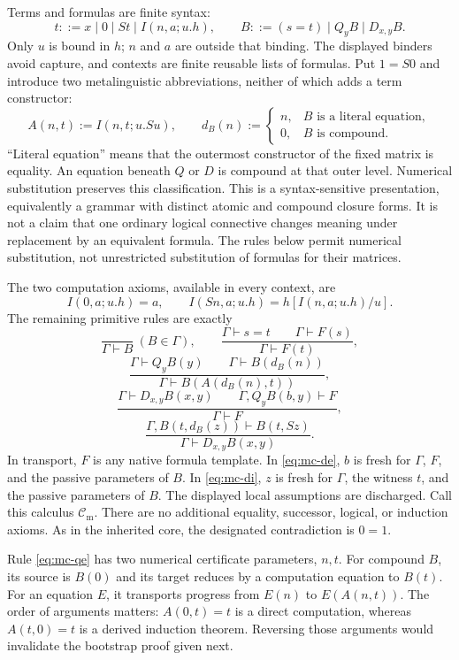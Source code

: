 \documentclass[11pt,letterpaper]{article}
\theoremstyle{definition}
\theoremstyle{remark}
\begin{document}
Terms and formulas are finite syntax:
\[
 t::=x\mid0\mid St\mid I(n,a;u.h),\qquad
 B::=(s=t)\mid Q_yB\mid D_{x,y}B.
\]
Only $u$ is bound in $h$; $n$ and $a$ are outside that binding.
The displayed binders avoid capture, and contexts are finite reusable
lists of formulas.  Put $1=S0$ and introduce two metalinguistic
abbreviations, neither of which adds a term constructor:
\[
 A(n,t):=I(n,t;u.Su),\qquad
 d_B(n):=
 \begin{cases}
 n,&B\text{ is a literal equation},\\
 0,&B\text{ is compound}.
 \end{cases}
 \tag{MC1}\label{eq:mc-data}
\]
``Literal equation'' means that the outermost constructor of the fixed
matrix is equality.  An equation beneath $Q$ or $D$ is compound at that
outer level.  Numerical substitution preserves this classification.
This is a syntax-sensitive presentation, equivalently a grammar with
distinct atomic and compound closure forms.  It is not a claim that
one ordinary logical connective changes meaning under replacement by
an equivalent formula.  The rules below permit numerical substitution,
not unrestricted substitution of formulas for their matrices.

The two computation axioms, available in every context, are
\[
 I(0,a;u.h)=a,\qquad
 I(Sn,a;u.h)=h[I(n,a;u.h)/u].
 \tag{MC2}\label{eq:mc-comp}
\]
The remaining primitive rules are exactly
\[
 \frac{}{\Gamma\vdash B}\ (B\in\Gamma),
 \qquad
 \frac{\Gamma\vdash s=t\qquad\Gamma\vdash F(s)}
      {\Gamma\vdash F(t)},
 \tag{MC3}\label{eq:mc-hyp-tr}
\]
\[
 \frac{\Gamma\vdash Q_yB(y)\qquad
       \Gamma\vdash B(d_B(n))}
      {\Gamma\vdash B(A(d_B(n),t))},
 \tag{MC4}\label{eq:mc-qe}
\]
\[
 \frac{\Gamma\vdash D_{x,y}B(x,y)\qquad
       \Gamma,Q_yB(b,y)\vdash F}
      {\Gamma\vdash F},
 \tag{MC5}\label{eq:mc-de}
\]
\[
 \frac{\Gamma,B(t,d_B(z))\vdash B(t,Sz)}
      {\Gamma\vdash D_{x,y}B(x,y)}.
 \tag{MC6}\label{eq:mc-di}
\]
In transport, $F$ is any native formula template.  In
\eqref{eq:mc-de}, $b$ is fresh for $\Gamma$, $F$, and the passive
parameters of $B$.  In \eqref{eq:mc-di}, $z$ is fresh for $\Gamma$,
the witness $t$, and the passive parameters of $B$.  The displayed local
assumptions are discharged.  Call this calculus $\mathcal C_{\mathrm m}$.
There are no additional equality, successor, logical, or induction axioms.
As in the inherited core, the designated contradiction is $0=1$.

Rule \eqref{eq:mc-qe} has two numerical certificate parameters, $n,t$.
For compound $B$, its source is $B(0)$ and its target reduces by a
computation equation to $B(t)$.  For an equation $E$, it transports
progress from $E(n)$ to $E(A(n,t))$.  The order of arguments matters:
$A(0,t)=t$ is a direct computation, whereas $A(t,0)=t$ is a derived
induction theorem.  Reversing those arguments would invalidate the
bootstrap proof given next.
\end{document}
